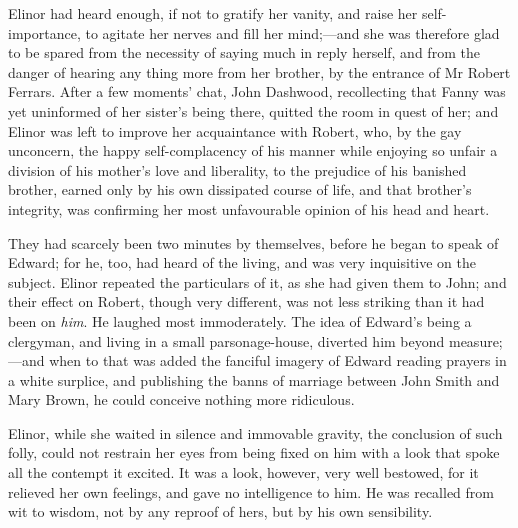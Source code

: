 Elinor had heard enough, if not to gratify her vanity, and raise her self-importance, to agitate her nerves and fill her mind;—and she was therefore glad to be spared from the necessity of saying much in reply herself, and from the danger of hearing any thing more from her brother, by the entrance of Mr Robert Ferrars. After a few moments’ chat, John Dashwood, recollecting that Fanny was yet uninformed of her sister’s being there, quitted the room in quest of her; and Elinor was left to improve her acquaintance with Robert, who, by the gay unconcern, the happy self-complacency of his manner while enjoying so unfair a division of his mother’s love and liberality, to the prejudice of his banished brother, earned only by his own dissipated course of life, and that brother’s integrity, was confirming her most unfavourable opinion of his head and heart.

They had scarcely been two minutes by themselves, before he began to speak of Edward; for he, too, had heard of the living, and was very inquisitive on the subject. Elinor repeated the particulars of it, as she had given them to John; and their effect on Robert, though very different, was not less striking than it had been on \textit{him}. He laughed most immoderately. The idea of Edward’s being a clergyman, and living in a small parsonage-house, diverted him beyond measure;—and when to that was added the fanciful imagery of Edward reading prayers in a white surplice, and publishing the banns of marriage between John Smith and Mary Brown, he could conceive nothing more ridiculous.

Elinor, while she waited in silence and immovable gravity, the conclusion of such folly, could not restrain her eyes from being fixed on him with a look that spoke all the contempt it excited. It was a look, however, very well bestowed, for it relieved her own feelings, and gave no intelligence to him. He was recalled from wit to wisdom, not by any reproof of hers, but by his own sensibility.

